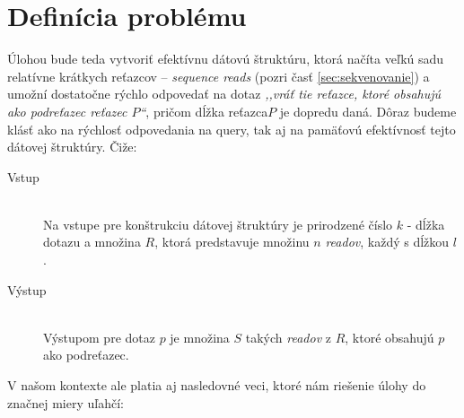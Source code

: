 

\section{Definícia problému}

Úlohou bude teda vytvoriť efektívnu dátovú štruktúru, ktorá načíta veľkú sadu
relatívne krátkych reťazcov -- \emph{sequence reads} (pozri časť \ref{sec:sekvenovanie}) a umožní dostatočne rýchlo odpovedať na dotaz \emph{,,vráť tie
reťazce, ktoré obsahujú ako podreťazec reťazec $P$``}, pričom dĺžka reťazca$P$
je dopredu daná. Dôraz budeme klásť ako na rýchlosť odpovedania na query, tak aj
na pamäťovú efektívnosť tejto dátovej štruktúry. Čiže:

\begin{description}
    \item[Vstup] \hfill \\
        Na vstupe pre konštrukciu dátovej štruktúry je prirodzené číslo $k$ -
        dĺžka dotazu a množina $R$, ktorá predstavuje množinu $n$ \emph{readov},
        každý s dĺžkou $l$.
    \item[Výstup] \hfill \\
        Výstupom pre dotaz $p$ je množina $S$ takých \emph{readov} z $R$, ktoré
        obsahujú $p$ ako podreťazec.
\end{description}

V našom kontexte ale platia aj nasledovné veci, ktoré nám riešenie úlohy do
značnej miery uľahčí:

